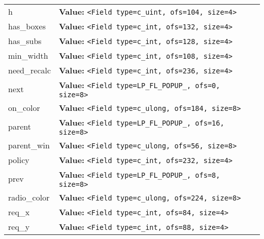 \begin{longtable}{|p{\varnamewidth}|p{\vardescrwidth}|l}
\raggedright h\- & \raggedright \textbf{Value:} 
{\tt {\textless}Field type=c\_uint, ofs=104, size=4{\textgreater}}&\\
\cline{1-2}
\raggedright h\-a\-s\-\_\-b\-o\-x\-e\-s\- & \raggedright \textbf{Value:} 
{\tt {\textless}Field type=c\_int, ofs=132, size=4{\textgreater}}&\\
\cline{1-2}
\raggedright h\-a\-s\-\_\-s\-u\-b\-s\- & \raggedright \textbf{Value:} 
{\tt {\textless}Field type=c\_int, ofs=128, size=4{\textgreater}}&\\
\cline{1-2}
\raggedright m\-i\-n\-\_\-w\-i\-d\-t\-h\- & \raggedright \textbf{Value:} 
{\tt {\textless}Field type=c\_int, ofs=108, size=4{\textgreater}}&\\
\cline{1-2}
\raggedright n\-e\-e\-d\-\_\-r\-e\-c\-a\-l\-c\- & \raggedright \textbf{Value:} 
{\tt {\textless}Field type=c\_int, ofs=236, size=4{\textgreater}}&\\
\cline{1-2}
\raggedright n\-e\-x\-t\- & \raggedright \textbf{Value:} 
{\tt {\textless}Field type=LP\_FL\_POPUP\_, ofs=0, size=8{\textgreater}}&\\
\cline{1-2}
\raggedright o\-n\-\_\-c\-o\-l\-o\-r\- & \raggedright \textbf{Value:} 
{\tt {\textless}Field type=c\_ulong, ofs=184, size=8{\textgreater}}&\\
\cline{1-2}
\raggedright p\-a\-r\-e\-n\-t\- & \raggedright \textbf{Value:} 
{\tt {\textless}Field type=LP\_FL\_POPUP\_, ofs=16, size=8{\textgreater}}&\\
\cline{1-2}
\raggedright p\-a\-r\-e\-n\-t\-\_\-w\-i\-n\- & \raggedright \textbf{Value:} 
{\tt {\textless}Field type=c\_ulong, ofs=56, size=8{\textgreater}}&\\
\cline{1-2}
\raggedright p\-o\-l\-i\-c\-y\- & \raggedright \textbf{Value:} 
{\tt {\textless}Field type=c\_int, ofs=232, size=4{\textgreater}}&\\
\cline{1-2}
\raggedright p\-r\-e\-v\- & \raggedright \textbf{Value:} 
{\tt {\textless}Field type=LP\_FL\_POPUP\_, ofs=8, size=8{\textgreater}}&\\
\cline{1-2}
\raggedright r\-a\-d\-i\-o\-\_\-c\-o\-l\-o\-r\- & \raggedright \textbf{Value:} 
{\tt {\textless}Field type=c\_ulong, ofs=224, size=8{\textgreater}}&\\
\cline{1-2}
\raggedright r\-e\-q\-\_\-x\- & \raggedright \textbf{Value:} 
{\tt {\textless}Field type=c\_int, ofs=84, size=4{\textgreater}}&\\
\cline{1-2}
\raggedright r\-e\-q\-\_\-y\- & \raggedright \textbf{Value:} 
{\tt {\textless}Field type=c\_int, ofs=88, size=4{\textgreater}}&\\

\end{longtable}
